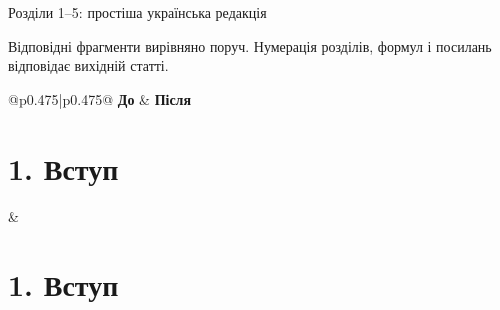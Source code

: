 \documentclass[11pt]{article}
\begin{document}
\begin{center}\Large Розділи 1--5: простіша українська редакція\end{center}
Відповідні фрагменти вирівняно поруч. Нумерація розділів, формул і посилань відповідає вихідній статті.
\setlength{\tabcolsep}{6mm}
\begin{longtable}{@{}p{0.475\textwidth}|p{0.475\textwidth}@{}}
\Large\textbf{До} & \Large\textbf{Після}\\\hline\endhead
\begin{minipage}[t]{\linewidth}
\section*{1. Вступ}

\end{minipage} &
\begin{minipage}[t]{\linewidth}
\section*{1. Вступ}


\end{minipage}
\end{longtable}
\end{document}
